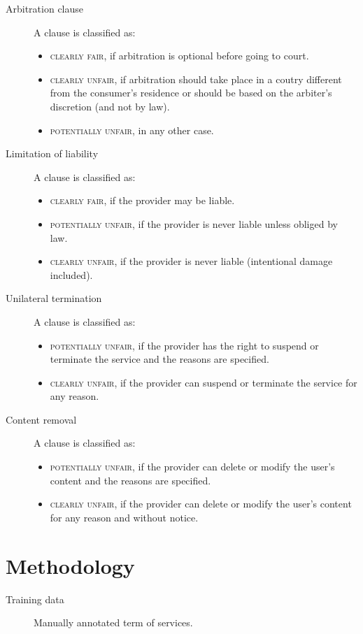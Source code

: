 \begin{description}
    \item[Arbitration clause] 
        A clause is classified as:
        \begin{itemize}
            \item \textsc{clearly fair}, if arbitration is optional before going to court.
            \item \textsc{clearly unfair}, if arbitration should take place in a coutry different from the consumer's residence or should be based on the arbiter's discretion (and not by law).
            \item \textsc{potentially unfair}, in any other case.
        \end{itemize}

    \item[Limitation of liability] 
        A clause is classified as:
        \begin{itemize}
            \item \textsc{clearly fair}, if the provider may be liable.
            \item \textsc{potentially unfair}, if the provider is never liable unless obliged by law.
            \item \textsc{clearly unfair}, if the provider is never liable (intentional damage included).
        \end{itemize}
    
    \item[Unilateral termination] 
        A clause is classified as:
        \begin{itemize}
            \item \textsc{potentially unfair}, if the provider has the right to suspend or terminate the service and the reasons are specified.
            \item \textsc{clearly unfair}, if the provider can suspend or terminate the service for any reason.
        \end{itemize}

    \item[Content removal] 
        A clause is classified as:
        \begin{itemize}
            \item \textsc{potentially unfair}, if the provider can delete or modify the user's content and the reasons are specified.
            \item \textsc{clearly unfair}, if the provider can delete or modify the user's content for any reason and without notice.
        \end{itemize}
\end{description}



\section{Methodology}

\begin{description}
    \item[Training data]
        Manually annotated term of services.
\end{description}